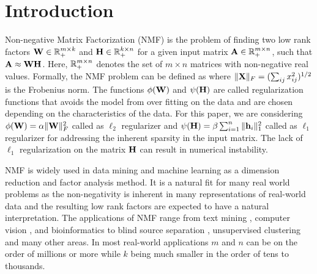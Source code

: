 \section{Introduction}


Non-negative Matrix Factorization (NMF) is the problem of finding two low rank factors $\mathbf{W}\in \mathbb{R}_+^{m\times k}$ and $\mathbf{H}\in \mathbb{R}_+^{k \times n}$ for a given input matrix  $\mathbf{A}\in \mathbb{R}_+^{m\times n}$, such that $\mathbf{A} \approx \mathbf{W} \mathbf{H}$.
Here, $\mathbb{R}_+^{m\times n}$ denotes the set of $m \times n$ matrices with non-negative real values.
Formally, the NMF problem \cite{seung2001algorithms} can be defined as 
where $\|{\mathbf{X}}\|_F=(\sum_{ij} x_{ij}^2)^{1/2}$ is the Frobenius norm. The functions $\phi (\mathbf{W})$ and $\psi (\mathbf{H})$ are called regularization functions that avoids the model from over fitting on the data and are chosen depending on the characteristics of the data. For this paper, we are considering $\phi(\mathbf{W}) = \alpha \|\mathbf{W}\|_F^2$ called as $\ell_2$ regularizer and $\psi(\mathbf{H}) = \beta \sum_{i=1}^n \| \mathbf{h}_{i} \|_1^2$ called as $\ell_1$ regularizer for addressing the inherent sparsity in the input matrix. The lack of $\ell_1$ regularization on the matrix $\mathbf{H}$ can result in numerical instability. 

NMF is widely used in data mining and machine learning as a dimension reduction and factor analysis method.
It is a natural fit for many real world problems as the non-negativity is inherent in many representations of real-world data and
the resulting low rank factors are expected to have a natural interpretation. The applications of NMF range from text mining \cite{pauca2004text},  computer vision \cite{hoyer2004non}, and bioinformatics \cite{kim2007sparse} to blind source separation  \cite{cichocki2009nonnegative}, unsupervised clustering \cite{kuang2012symmetric,kuang2013symnmf}  and many other areas.
In most real-world applications $m$ and $n$ can be on the order of millions or more while $k$ being much smaller in the order of tens to thousands.

